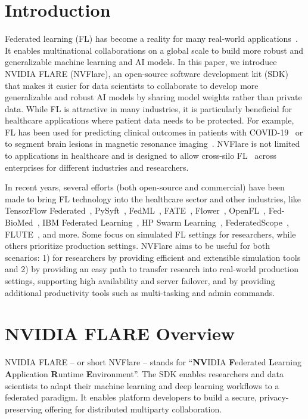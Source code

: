 \documentclass[11pt]{article}
\begin{document}
\section{Introduction}
Federated learning (FL) has become a reality for many real-world applications~\cite{rieke2020future}. It enables multinational collaborations on a global scale to build more robust and generalizable machine learning and AI models.
%
In this paper, we introduce NVIDIA FLARE (NVFlare), an open-source software development kit (SDK) that makes it easier for data scientists to collaborate to develop more generalizable and robust AI models by sharing model weights rather than private data.
%
While FL is attractive in many industries, it is particularly beneficial for healthcare applications where patient data needs to be protected. For example, FL has been used for predicting clinical outcomes in patients with COVID-19~\cite{dayan2021federated} or to segment brain lesions in magnetic resonance imaging~\cite{sheller2018multi,sheller2020federated}. NVFlare is not limited to applications in healthcare and is designed to allow cross-silo FL~\cite{kairouz2019advances} across enterprises for different industries and researchers.

In recent years, several efforts (both open-source and commercial) have been made to bring FL technology into the healthcare sector and other industries, like TensorFlow Federated~\cite{abadi2016tensorflow}, PySyft~\cite{ziller2021pysyft}, FedML~\cite{he2020fedml}, FATE~\cite{liu2021fate}, Flower~\cite{beutel2020flower}, OpenFL~\cite{reina2021openfl}, Fed-BioMed~\cite{silva2020fed}, IBM Federated Learning~\cite{ludwig2020ibm}, HP Swarm Learning~\cite{warnat2021swarm}, FederatedScope~\cite{xie2022federatedscope}, FLUTE~\cite{dimitriadis2022flute}, and more. Some focus on simulated FL settings for researchers, while others prioritize production settings. NVFlare aims to be useful for both scenarios: 1) for researchers by providing efficient and extensible simulation tools and 2) by providing an easy path to transfer research into real-world production settings, supporting high availability and server failover, and by providing additional productivity tools such as multi-tasking and admin commands.

\section{NVIDIA FLARE Overview}

NVIDIA FLARE -- or short NVFlare -- stands for ``\textbf{NV}IDIA \textbf{F}ederated \textbf{L}earning \textbf{A}pplication \textbf{R}untime \textbf{E}nvironment''.
The SDK enables researchers and data scientists to adapt their machine learning and deep learning workflows to a federated paradigm. It enables platform developers to build a secure, privacy-preserving offering for distributed multiparty collaboration.
\end{document}
